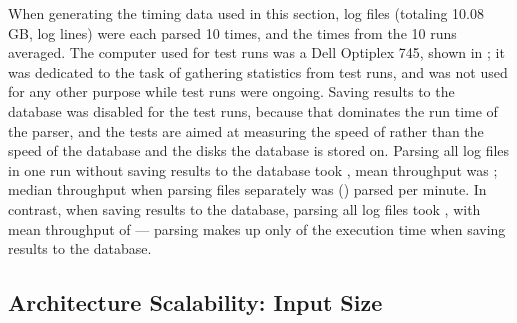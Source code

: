 When generating the timing data used in this section, \numberOFlogFILES{}
log files (totaling 10.08 GB, \numberOFlogLINEShuman{} log lines) were each
parsed 10 times, and the times from the 10 runs averaged.  The computer
used for test runs was a Dell Optiplex 745, shown in ; it was dedicated to the task of
gathering statistics from test runs, and was not used for any other purpose
while test runs were ongoing.  Saving results to the database was disabled
for the test runs, because that dominates the run time of the parser, and
the tests are aimed at measuring the speed of \parsername{} rather than the
speed of the database and the disks the database is stored on.  Parsing all
\numberOFlogFILES{} log files in one run without saving results to the
database took , mean throughput was
; median throughput when parsing
files separately was 
() parsed per minute.  In
contrast, when saving results to the database, parsing all
\numberOFlogFILES{} log files took
, with mean throughput of
 --- parsing makes up only
 of the
execution time when saving results to the database.

\subsection{Architecture Scalability: Input Size}

